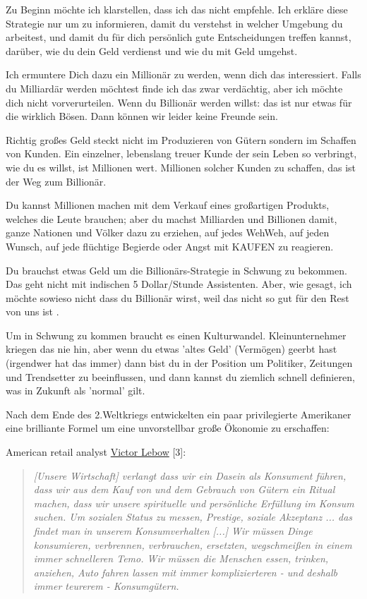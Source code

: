 Zu Beginn möchte ich klarstellen, dass ich das nicht empfehle. Ich erkläre diese Strategie nur um zu informieren, damit du verstehst in welcher Umgebung du arbeitest, und damit du für dich persönlich gute Entscheidungen treffen kannst, darüber, wie du dein Geld verdienst und wie du mit Geld umgehst.

Ich ermuntere Dich dazu ein Millionär zu werden, wenn dich das interessiert. Falls du Milliardär werden möchtest finde ich das zwar verdächtig, aber ich möchte dich nicht vorverurteilen. Wenn du Billionär werden willst: das ist nur etwas für die wirklich Bösen. Dann können wir leider keine Freunde sein.

Richtig großes Geld steckt nicht im Produzieren von Gütern sondern im Schaffen von Kunden. Ein einzelner, lebenslang treuer Kunde der sein Leben so verbringt, wie du es willst, ist Millionen wert. Millionen solcher Kunden zu schaffen, das ist der Weg zum Billionär.

Du kannst Millionen machen mit dem Verkauf eines großartigen Produkts, welches die Leute brauchen; aber du machst Milliarden und Billionen damit, ganze Nationen und Völker dazu zu erziehen, auf jedes WehWeh, auf jeden Wunsch, auf jede flüchtige Begierde oder Angst mit KAUFEN zu reagieren.

Du brauchst etwas Geld um die Billionärs-Strategie in Schwung zu bekommen. Das geht nicht mit indischen 5 Dollar/Stunde Assistenten. Aber, wie gesagt, ich  möchte sowieso nicht dass du Billionär wirst, weil das nicht so gut für den Rest von uns ist .

Um in Schwung zu kommen braucht es einen Kulturwandel. Kleinunternehmer kriegen das nie hin, aber wenn du etwas 'altes Geld' (Vermögen) geerbt hast (irgendwer hat das immer) dann bist du in der Position um Politiker, Zeitungen und Trendsetter zu beeinflussen, und dann kannst du ziemlich schnell definieren, was in Zukunft als 'normal' gilt.

Nach dem Ende des 2.Weltkriegs entwickelten ein paar privilegierte Amerikaner eine brilliante Formel um eine unvorstellbar große Ökonomie zu erschaffen:


American retail analyst \href{https://en.wikipedia.org/wiki/Victor_Lebow}{Victor Lebow} [3]:
\begin{quote}
\textit{
[Unsere Wirtschaft] verlangt dass wir ein Dasein als Konsument führen, dass wir aus dem Kauf von und dem Gebrauch von Gütern ein Ritual machen, dass wir unsere spirituelle und persönliche Erfüllung im Konsum suchen. Um sozialen Status zu messen, Prestige, soziale Akzeptanz ... das findet man in unserem Konsumverhalten [...] Wir müssen Dinge konsumieren, verbrennen, verbrauchen, ersetzten, wegschmeißen in einem immer schnelleren Temo. Wir müssen die Menschen essen, trinken, anziehen, Auto fahren lassen mit immer komplizierteren - und deshalb immer teurerem -  Konsumgütern.}
\end{quote} 

